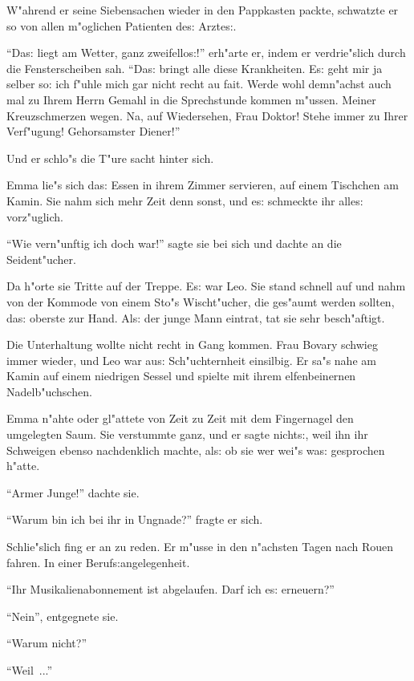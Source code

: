 \documentclass[oneside,12pt]{book}
\newenvironment{antiqua}{\normalfont}{}%
\newcommand{\s}{s:}%
\begin{document}
W"ahrend er seine Siebensachen wieder in den Pappkasten packte,
schwatzte er so von allen m"oglichen Patienten de{\s} Arzte{\s}.

"`Da{\s} liegt am Wetter, ganz zweifello{\s}!"' erh"arte er, indem
er verdrie"slich durch die Fensterscheiben sah. "`Da{\s} bringt
alle diese Krankheiten. E{\s} geht mir ja selber so: ich f"uhle
mich gar nicht recht \begin{antiqua}au fait\end{antiqua}. Werde
wohl demn"achst auch mal zu Ihrem Herrn Gemahl in die Sprechstunde
kommen m"ussen. Meiner Kreuzschmerzen wegen. Na, auf Wiedersehen,
Frau Doktor! Stehe immer zu Ihrer Verf"ugung! Gehorsamster
Diener!"'

Und er schlo"s die T"ure sacht hinter sich.

Emma lie"s sich da{\s} Essen in ihrem Zimmer servieren, auf einem
Tischchen am Kamin. Sie nahm sich mehr Zeit denn sonst, und e{\s}
schmeckte ihr alle{\s} vorz"uglich.

"`Wie vern"unftig ich doch war!"' sagte sie bei sich und dachte an
die Seident"ucher.

Da h"orte sie Tritte auf der Treppe. E{\s} war Leo. Sie stand
schnell auf und nahm von der Kommode von einem Sto"s Wischt"ucher,
die ges"aumt werden sollten, da{\s} oberste zur Hand. Al{\s} der
junge Mann eintrat, tat sie sehr besch"aftigt.

Die Unterhaltung wollte nicht recht in Gang kommen. Frau Bovary
schwieg immer wieder, und Leo war au{\s} Sch"uchternheit
einsilbig. Er sa"s nahe am Kamin auf einem niedrigen Sessel und
spielte mit ihrem elfenbeinernen Nadelb"uchschen.

Emma n"ahte oder gl"attete von Zeit zu Zeit mit dem Fingernagel
den umgelegten Saum. Sie verstummte ganz, und er sagte nicht{\s},
weil ihn ihr Schweigen ebenso nachdenklich machte, al{\s} ob sie
wer wei"s wa{\s} gesprochen h"atte.

"`Armer Junge!"' dachte sie.

"`Warum bin ich bei ihr in Ungnade?"' fragte er sich.

Schlie"slich fing er an zu reden. Er m"usse in den n"achsten Tagen
nach Rouen fahren. In einer Beruf{\s}angelegenheit.

"`Ihr Musikalienabonnement ist abgelaufen. Darf ich e{\s}
erneuern?"'

"`Nein"', entgegnete sie.

"`Warum nicht?"'

"`Weil~..."'
\end{document}
